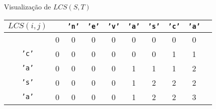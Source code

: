 \begin{frame}[fragile]{Visualização de $LCS(S, T)$}

    \begin{table}
        \centering

        \begin{tabular}{c|ccccccccc} $LCS(i, j)$ &
        & \textcolor{red!80!black}{\texttt{'n'}}
        & \textcolor{red!80!black}{\texttt{'e'}}
        & \textcolor{red!80!black}{\texttt{'v'}}
        & \textcolor{red!80!black}{\texttt{'a'}}
        & \textcolor{red!80!black}{\texttt{'s'}}
        & \textcolor{red!80!black}{\texttt{'c'}}
        & \textcolor{red!80!black}{\texttt{'a'}} \\
        \hline
&0&0&0&0&0&0&0&0\\
\textcolor{red!80!black}{\texttt{'c'}}
&0&0&0&0&0&0&1&1\\
\textcolor{red!80!black}{\texttt{'a'}}
&0&0&0&0&1&1&1&2\\
\textcolor{red!80!black}{\texttt{'s'}}
&0&0&0&0&1&2&2&2\\
\textcolor{red!80!black}{\texttt{'a'}}
&0&0&0&0&1&2&2&3\\
        \end{tabular}

    \end{table}

\end{frame}

